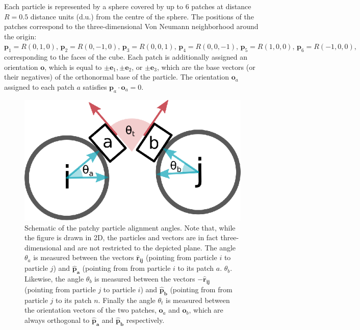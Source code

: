 Each particle is represented by a sphere covered by up to 6 patches at distance $R = 0.5$ distance units (d.u.) from the centre of the sphere. The positions of the patches correspond to the three-dimensional Von Neumann neighborhood around the origin:
$
 \mathbf{p}_1 = R \left( 0,1,0\right),\, \mathbf{p}_2 = R \left( 0,-1,0 \right),\,   %
 \mathbf{p}_3 = R \left( 0,0,1 \right),\, \mathbf{p}_4 = R \left(  0, 0, -1 \right),\, %
 \mathbf{p}_5 = R \left( 1,0,0 \right),\, \mathbf{p}_6 = R \left( -1, 0, 0 \right),
$
corresponding to the faces of the cube. Each patch is additionally assigned an orientation $\mathbf{o}$, which is equal to
$\pm \mathbf{e}_1, \pm \mathbf{e}_2$, or $\pm \mathbf{e}_3$, which are the base vectors (or their negatives) of the orthonormal base of the particle. The orientation  $\mathbf{o}_a$ assigned to each patch $a$ satisfies $\mathbf{p}_a \cdot \mathbf{o}_a = 0$.

\begin{figure}[h]
\centering
\includegraphics[width=0.8\linewidth]{figures/pp.eps}
\caption{Schematic of the patchy particle alignment angles. Note that, while the figure is drawn in 2D, the particles and vectors are in fact three-dimensional and are not restricted to the depicted plane. The angle \(\theta_a\) is measured between the vectors \(\mathbf{\hat{r}_{ij}}\) (pointing from particle \(i\) to particle \(j\)) and \(\mathbf{\hat{p}_a}\) (pointing from from particle \(i\) to its patch \(a\).  \(\theta_b\). Likewise, the angle \(\theta_b\) is measured between the vectors \(-\mathbf{\hat{r}_{ij}}\) (pointing from particle \(j\) to particle \(i\)) and \(\mathbf{\hat{p}_b}\) (pointing from from particle \(j\) to its patch \(n\). Finally the angle \(\theta_t\) is measured between the orientation vectors of the two patches, \(\mathbf{o}_{a}\) and \(\mathbf{o}_{b}\), which are always orthogonal to \(\mathbf{\hat{p}_a}\) and \(\mathbf{\hat{p}_b}\) respectively.
}
\label{fig:pp}
\end{figure}

